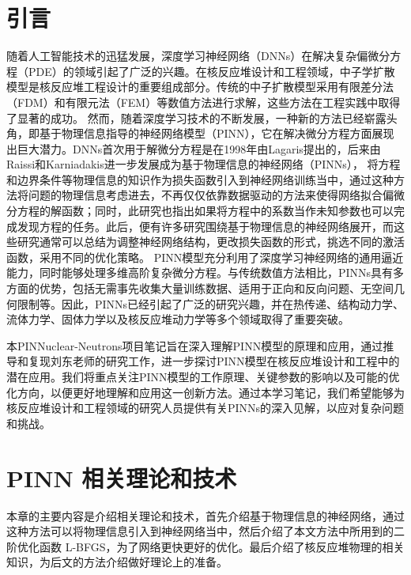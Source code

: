\documentclass{Sichuan Normal University}
\begin{document}


\maketitle
\tableofcontents  %
\section*{引言}
随着人工智能技术的迅猛发展，深度学习神经网络（DNNs）在解决复杂偏微分方程（PDE）的领域引起了广泛的兴趣。在核反应堆设计和工程领域，中子学扩散模型是核反应堆工程设计的重要组成部分。传统的中子扩散模型采用有限差分法（FDM）和有限元法（FEM）等数值方法进行求解，这些方法在工程实践中取得了显著的成功。
然而，随着深度学习技术的不断发展，一种新的方法已经崭露头角，即基于物理信息指导的神经网络模型（PINN），它在解决微分方程方面展现出巨大潜力。DNNs首次用于解微分方程是在1998年由Lagaris提出的\cite{lagarisArtificialNeuralNetworks1998}，后来由Raissi和Karniadakis进一步发展成为基于物理信息的神经网络（PINNs）\cite{raissiPhysicsinformedNeuralNetworks2019}，
将方程和边界条件等物理信息的知识作为损失函数引入到神经网络训练当中，通过这种方法将问题的物理信息考虑进去，不再仅仅依靠数据驱动的方法来使得网络拟合偏微分方程的解函数；同时，此研究也指出如果将方程中的系数当作未知参数也可以完成发现方程的任务。此后，便有许多研究围绕基于物理信息的神经网络展开，而这些研究通常可以总结为调整神经网络结构，更改损失函数的形式，挑选不同的激活函数，采用不同的优化策略。
PINN模型充分利用了深度学习神经网络的通用逼近能力，同时能够处理多维高阶复杂微分方程。与传统数值方法相比，PINNs具有多方面的优势，包括无需事先收集大量训练数据、适用于正向和反向问题、无空间几何限制等。因此，PINNs已经引起了广泛的研究兴趣，并在热传递、结构动力学、流体力学、固体力学以及核反应堆动力学等多个领域取得了重要突破。

本PINNuclear-Neutrons项目笔记旨在深入理解PINN模型的原理和应用，通过推导和复现刘东老师的研究工作\cite{LiuDongJiYuPINNShenDuJiQiXueXiJiShuQiuJieDuoWeiZhongZiXueKuoSanFangCheng2022}，进一步探讨PINN模型在核反应堆设计和工程中的潜在应用。我们将重点关注PINN模型的工作原理、关键参数的影响以及可能的优化方向，以便更好地理解和应用这一创新方法。通过本学习笔记，我们希望能够为核反应堆设计和工程领域的研究人员提供有关PINNs的深入见解，以应对复杂问题和挑战。


\section{PINN 相关理论和技术}
本章的主要内容是介绍相关理论和技术，首先介绍基于物理信息的神经网络，通过这种方法可以将物理信息引入到神经网络当中，然后介绍了本文方法中所用到的二阶优化函数 L-BFGS，为了网络更快更好的优化。最后介绍了核反应堆物理的相关知识，为后文的方法介绍做好理论上的准备。
\end{document}
